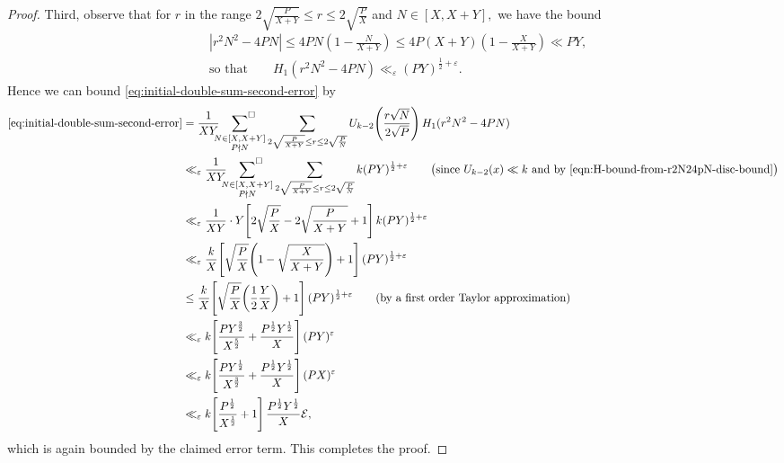 \documentclass[12pt,letterpaper,reqno]{amsart}
\theoremstyle{plain}
\theoremstyle{definition}
\numberwithin{equation}{section}
\numberwithin{figure}{section}
\numberwithin{table}{section}
\newcommand{\lrabs}[1]{\!\left\lvert #1 \right\lvert}
\newcommand{\lrp}[1]{\!\left(#1\right)}
\newcommand{\lrb}[1]{\!\left[#1\right]}
\newcommand{\EE}{\mathcal{E}}
\begin{document}
\begin{proof}
    Third, observe that for $r$ in the range $2\sqrt{\frac{P}{X+Y}}\leq r\leq 2\sqrt{\frac{P}{X}}$ and $N\in[X,X+Y],$ we have the bound
    \begin{align}
        &\lrabs{r^2N^2-4PN} \leq 4PN\lrp{1-\frac{N}{X+Y}}\leq 4P(X+Y)\lrp{1-\frac{X}{X+Y}}\ll PY, \\
        &\text{so that} \qquad
        H_1(r^2N^2-4PN) \ll_\varepsilon  (PY)^{\frac{1}{2}+\varepsilon}. \label{eqn:H-bound-from-r2N24pN-disc-bound}
    \end{align}
    Hence
    we can bound \eqref{eq:initial-double-sum-second-error} by 
    \begin{align}
        \eqref{eq:initial-double-sum-second-error}
        &= \frac{1}{XY}
        \sideset{}{^\square}\sum_{\substack{N\in[X,X+Y] \\ P\nmid N}}
        \sum_{2\sqrt{\frac{P}{X+Y}}\le r \le 2\sqrt{\frac{P}{N}}}  U_{k-2}\lrp{\frac{r\sqrt{N}}{2\sqrt{P}}} H_1(r^2N^2-4PN) \\
        &\ll_\varepsilon  \frac{1}{XY} \sideset{}{^\square}\sum_{\substack{N\in [X,X+Y]\\P\nmid N}} \sum_{2\sqrt{\frac{P}{X+Y}}\le r \le 2\sqrt{\frac{P}{N}}} k(PY)^{\frac{1}{2}+\varepsilon}  
        \qquad  \text{\big(since $U_{k-2}(x)\ll k$ and by \eqref{eqn:H-bound-from-r2N24pN-disc-bound}\big)}
        \\ 
        & \ll_\varepsilon  \frac{1}{XY}\cdot Y\lrb{2\sqrt{\frac{P}{X}}-2\sqrt{\frac{P}{X+Y}}+1} k(PY)^{\frac{1}{2}+\varepsilon} \\ 
        &\ll_\varepsilon  \frac{k}{X} \lrb{\sqrt{\frac{P}{X}}
        \lrp{1-\sqrt{\frac{X}{X+Y}}}+1} (PY)^{\frac{1}{2}+\varepsilon} \\
        & \le \frac{k}{X} \lrb{\sqrt{\frac{P}{X}} \lrp{\frac{1}{2} \frac{Y}{X}} + 1} (PY)^{\frac{1}{2}+\varepsilon} 
        \qquad \text{(by a first order Taylor approximation)}
        \\
        &\ll_\varepsilon   k\lrb{\frac{PY^{\frac{3}{2}}}{X^{\frac{5}{2}}}+\frac{P^\frac{1}{2}Y^\frac{1}{2}}{X}}(PY)^\varepsilon \\
        &\ll_\varepsilon  k\lrb{\frac{PY^\frac{1}{2}}{X^{\frac{3}{2}}}+\frac{P^\frac{1}{2}Y^\frac{1}{2}}{X}}(PX)^\varepsilon \\
        &\ll_\varepsilon  k\lrb{
            \frac{P^\frac{1}{2}}{X^\frac{1}{2}} 
            + 1
        }\frac{P^\frac{1}{2} Y^\frac{1}{2}}{X} \EE, 
    \end{align}
    which is again bounded by the claimed error term. This completes the proof.
\end{proof}
\end{document}
